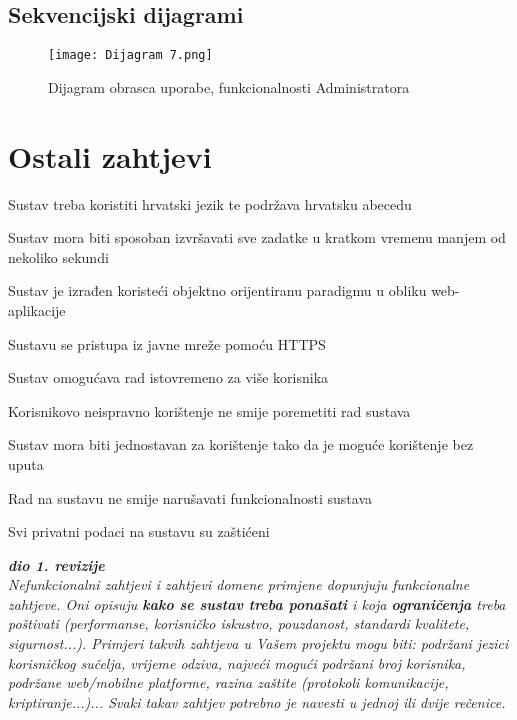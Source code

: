 			\subsection{Sekvencijski dijagrami}
				
				\begin{figure}
					\centering
					\texttt{[image: Dijagram 7.png]}
					\caption{Dijagram obrasca uporabe, funkcionalnosti Administratora}
				\end{figure}				
				\eject
	
		\section{Ostali zahtjevi}
		\begin{packed_item}
						\item \textit{} Sustav treba koristiti hrvatski jezik te podržava hrvatsku abecedu
						\item \textit{} Sustav mora biti sposoban izvršavati sve zadatke u kratkom vremenu manjem od nekoliko sekundi
						\item \textit{} Sustav je izrađen koristeći objektno orijentiranu paradigmu u obliku web-aplikacije
						\item \textit{} Sustavu se pristupa iz javne mreže pomoću HTTPS
						\item \textit{} Sustav omogućava rad istovremeno za više korisnika
				
						\item \textit{} Korisnikovo neispravno korištenje ne smije poremetiti rad sustava
						\item \textit{} Sustav mora biti jednostavan za korištenje tako da je moguće korištenje bez uputa
						\item \textit{} Rad na sustavu ne smije narušavati funkcionalnosti sustava
						\item \textit{} Svi privatni podaci na sustavu su zaštićeni 
				
		\end{packed_item}
		
		
		
			\textbf{\textit{dio 1. revizije}}\\
		 
			 \textit{Nefunkcionalni zahtjevi i zahtjevi domene primjene dopunjuju funkcionalne zahtjeve. Oni opisuju \textbf{kako se sustav treba ponašati} i koja \textbf{ograničenja} treba poštivati (performanse, korisničko iskustvo, pouzdanost, standardi kvalitete, sigurnost...). Primjeri takvih zahtjeva u Vašem projektu mogu biti: podržani jezici korisničkog sučelja, vrijeme odziva, najveći mogući podržani broj korisnika, podržane web/mobilne platforme, razina zaštite (protokoli komunikacije, kriptiranje...)... Svaki takav zahtjev potrebno je navesti u jednoj ili dvije rečenice.}
			 
			 
			 
	